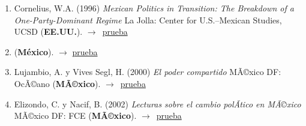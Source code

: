 \documentclass[12 pt, letter]{article}
\newenvironment{CitasMiTrabajo}{
    \begin{footnotesize}
    \begin{enumerate}[label={\footnotesize\emph{cita~\arabic*}},ref=\arabic*] %
        \setlength{\itemsep}{.1\itemsep}
        \setlength{\parskip}{.1\parskip}
    }{\end{enumerate}\end{footnotesize}}
\begin{document}
        \begin{CitasMiTrabajo}

        \item Cornelius, W.A. (1996)
        \emph{Mexican Politics in Transition: The Breakdown of a One-Party-Dominant Regime}
        La Jolla: Center for U.S.--Mexican Studies, UCSD (\textbf{EE.UU.}). $\rightarrow$~\href{http://ericmagar.com/cv/cites/tesisItam/corneliusMPIT.pdf}{prueba}

        \item {} (\textbf{M\'exico}). $\rightarrow$ \href{http://ericmagar.com/cv/cites/tesisItam/deremesYuxtap1999pyg.pdf}{prueba}

        \item Lujambio, A. y Vives Segl, H. (2000)
        \emph{El poder compartido}
        MÃ©xico DF: OcÃ©ano (\textbf{MÃ©xico}). $\rightarrow$~\href{http://ericmagar.com/cv/cites/tesisItam/LujambioVivesPC.pdf}{prueba}

        \item Elizondo, C. y Nacif, B. (2002)
        \emph{Lecturas sobre el cambio polÃ­tico en MÃ©xico}
        MÃ©xico DF: FCE (\textbf{MÃ©xico}). $\rightarrow$~\href{http://ericmagar.com/cv/cites/tesisItam/elizNacif.pdf}{prueba}


        \label{ncites:magar.1994} %

        \end{CitasMiTrabajo}
\end{document}
